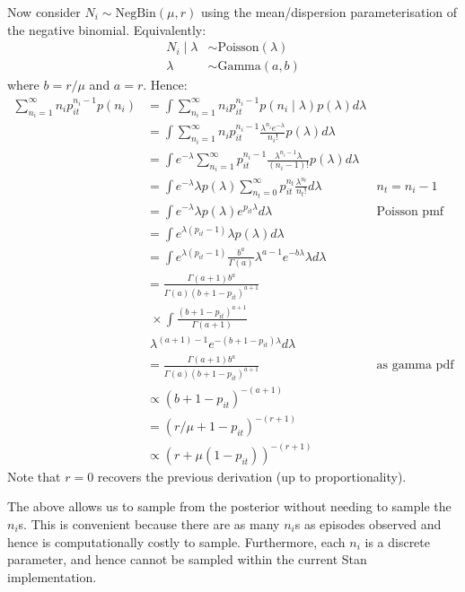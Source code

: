 \documentclass[thesis.tex]{subfiles}
\begin{document}
Now consider $N_i \sim \text{NegBin}(\mu, r)$ using the
mean/dispersion parameterisation of the negative binomial. Equivalently:
\begin{align}
N_i \mid \lambda &\sim \text{Poisson}(\lambda) \\
\lambda &\sim \text{Gamma}(a, b)
\end{align}
where $b = r / \mu$ and $a = r$.
Hence:
\begin{align}
\sum_{n_i=1}^\infty n_i p_{it}^{n_i- 1} p(n_i) 
&= \int \sum_{n_i=1}^\infty n_i p_{it}^{n_i- 1} p(n_i \mid \lambda) p(\lambda) d\lambda \\
&= \int \sum_{n_i=1}^\infty n_i p_{it}^{n_i- 1} \frac{\lambda^{n_i} e^{-\lambda}}{n_i!} p(\lambda) d\lambda \\
&= \int e^{-\lambda} \sum_{n_i=1}^\infty p_{it}^{n_i- 1} \frac{\lambda^{n_i-1}\lambda }{(n_i-1)!} p(\lambda) d\lambda \\
&= \int e^{-\lambda} \lambda p(\lambda) \sum_{n_t=0}^\infty p_{it}^{n_t} \frac{\lambda^{n_t} }{n_t!} d\lambda &n_t = n_i - 1 \\
&= \int e^{-\lambda} \lambda p(\lambda) e^{p_{it}\lambda} d\lambda &\text{Poisson pmf} \\
&= \int e^{\lambda (p_{it} - 1)} \lambda p(\lambda) d\lambda \\
&= \int e^{\lambda (p_{it} - 1)} \frac{b^a}{\Gamma(a)} \lambda^{a-1} e^{-b\lambda} \lambda d\lambda \\
&= \frac{\Gamma(a+1)b^a}{\Gamma(a) (b+1-p_{it})^{a+1}} \\ 
  &\; \times \int \frac{(b+1-p_{it})^{a+1}}{\Gamma(a+1)} \\
  &\; \lambda^{(a+1)-1} e^{-(b+1-p_{it})\lambda} d\lambda \\
&= \frac{\Gamma(a+1)b^a}{\Gamma(a) (b+1-p_{it})^{a+1}} &\text{as gamma pdf} \\
&\propto (b+1-p_{it})^{-(a+1)} \\
&= (r/\mu+1-p_{it})^{-(r+1)} \\
&\propto (r+\mu (1-p_{it}))^{-(r+1)}
\end{align}
Note that $r=0$ recovers the previous derivation (up to
proportionality).

The above allows us to sample from the posterior without needing to
sample the $n_i$s. This is convenient because there are as many
$n_i$s as episodes observed and hence is computationally costly to
sample. Furthermore, each $n_i$ is a discrete parameter, and hence
cannot be sampled within the current Stan implementation.
\end{document}
